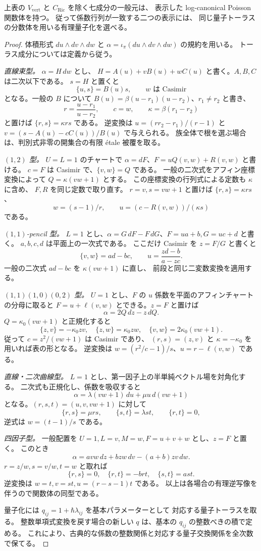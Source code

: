 \begin{proposition}\label{prop:p1p2-seven-toric}
上表の $V_{\mathrm{vert}}$ と $C_{\mathrm{Ric}}$ を除く七成分の一般元は、
表示した log-canonical Poisson 関数体を持つ。
従って係数行列が一致する二つの表示には、
同じ量子トーラスの分数体を用いる有理量子化を選べる。
\end{proposition}
\begin{proof}
体積形式 $du\wedge dv\wedge dw$ と
$\alpha=\iota_\pi(du\wedge dv\wedge dw)$ の規約を用いる。
トーラス成分については定義から従う。

\emph{直線束型。}
$\alpha=H\,dw$ とし、
$H=A(u)+vB(u)+wC(u)$ と書く。$A,B,C$ は二次以下である。
$s=H$ と置くと
\[
 \{u,s\}=B(u)s,\qquad w\text{ は Casimir}
\]
となる。一般の $B$ について
$B(u)=\beta(u-r_1)(u-r_2)$、$r_1\ne r_2$ と書き、
\[
 r=\frac{u-r_1}{u-r_2},\qquad c=w,\qquad
 \kappa=\beta(r_1-r_2)
\]
と置けば $\{r,s\}=\kappa rs$ である。
逆変換は $u=(rr_2-r_1)/(r-1)$ と
$v=(s-A(u)-cC(u))/B(u)$ で与えられる。
族全体で根を選ぶ場合は、判別式非零の開集合の有限 \'etale 被覆を取る。

\emph{$(1,2)$ 型。}
$U=L=1$ のチャートで
$\alpha=dF$、$F=uQ(v,w)+R(v,w)$ と書ける。
$c=F$ は Casimir で、$\{v,w\}=Q$ である。
一般の二次式をアフィン座標変換によって
$Q=\kappa(vw+1)$ とする。
この座標変換の行列式による定数も $\kappa$ に含め、
$F,R$ を同じ定数で取り直す。
$r=v,s=vw+1$ と置けば $\{r,s\}=\kappa rs$、
\[
 w=(s-1)/r,\qquad u=(c-R(v,w))/(\kappa s)
\]
である。

\emph{$(1,1)$-pencil 型。}
$L=1$ とし、$\alpha=G\,dF-F\,dG$、$F=ua+b,G=uc+d$ と書く。
$a,b,c,d$ は平面上の一次式である。
ここだけ Casimir を $z=F/G$ と書くと
\[
 \{v,w\}=ad-bc,\qquad
 u=\frac{zd-b}{a-zc}.
\]
一般の二次式 $ad-bc$ を $\kappa(vw+1)$ に直し、
前段と同じ二変数変換を適用する。

\emph{$(1,1)(1,0)(0,2)$ 型。}
$U=1$ とし、$F$ の $u$ 係数を平面のアフィンチャートの分母に取ると
$F=u+\ell(v,w)$ とできる。$z=F$ と置けば
\[
 \alpha=2Q\,dz-z\,dQ.
\]
$Q=\kappa_0(vw+1)$ と正規化すると
\[
 \{z,v\}=-\kappa_0zv,\quad
 \{z,w\}=\kappa_0zw,\quad
 \{v,w\}=2\kappa_0(vw+1).
\]
従って $c=z^2/(vw+1)$ は Casimir であり、
$(r,s)=(z,v)$ と $\kappa=-\kappa_0$ を用いれば表の形となる。
逆変換は $w=(r^2/c-1)/s$、$u=r-\ell(v,w)$ である。

\emph{直線・二次曲線型。}
$L=1$ とし、第一因子上の半単純ベクトル場を対角化する。
二次式も正規化し、係数を吸収すると
\[
 \alpha=\lambda(vw+1)\,du+\mu u\,d(vw+1)
\]
となる。$(r,s,t)=(u,v,vw+1)$ に対して
\[
 \{r,s\}=\mu rs,\qquad \{s,t\}=\lambda st,
 \qquad \{r,t\}=0,
\]
逆式は $w=(t-1)/s$ である。

\emph{四因子型。}
一般配置を $U=1,L=v,M=w,F=u+v+w$ とし、$z=F$ と置く。
このとき
\[
 \alpha=avw\,dz+bzw\,dv-(a+b)zv\,dw.
\]
$r=z/w,s=v/w,t=w$ と取れば
\[
 \{r,s\}=0,\quad \{r,t\}=-brt,\quad \{s,t\}=ast.
\]
逆変換は $w=t,v=st,u=(r-s-1)t$ である。
以上は各場合の有理逆写像を伴うので関数体の同型である。

量子化には $q_{ij}=1+\hbar\lambda_{ij}$ を基本パラメーターとして
対応する量子トーラスを取る。
整数単項式変換を戻す場合の新しい $q$ は、基本の $q_{ij}$ の整数べきの積で定める。
これにより、古典的な係数の整数関係と対応する量子交換関係を全次数で保てる。
\end{proof}

